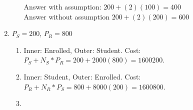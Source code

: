 \documentclass{report}
\begin{document}
\begin{enumerate}
\begin{enumerate}
			Answer with assumption: $200+ (2)(100) = 400$ \\
			Answer without assumption $200 + (2)(200) = 600$
		\end{enumerate}
		\newpage
		\item $P_S = 200$, $P_R = 800$
		\begin{enumerate}
			\item Inner: Enrolled, Outer: Student. Cost: $P_S + N_S * P_R = 200 + 2000(800) = 1600200$.
			\item Inner: Student, Outer: Enrolled. Cost: $P_R + N_R * P_S = 800 + 8000(200) = 1600800$.
			\item 
		\end{enumerate}
	\end{enumerate}
\end{document}
